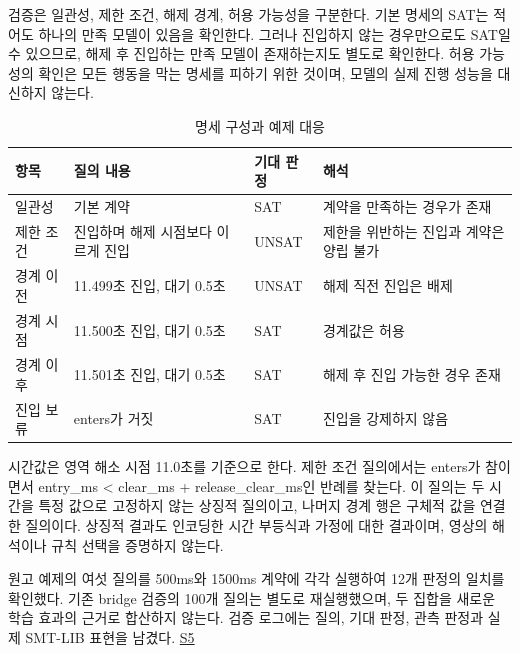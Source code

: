 \documentclass[10pt,a4paper,twocolumn]{article}\usepackage[margin=18mm]{geometry}\usepackage{fontspec,kotex}
\begin{document}
검증은 일관성, 제한 조건, 해제 경계, 허용 가능성을 구분한다. 기본 명세의 SAT는 적어도 하나의 만족 모델이 있음을 확인한다. 그러나 진입하지 않는 경우만으로도 SAT일 수 있으므로, 해제 후 진입하는 만족 모델이 존재하는지도 별도로 확인한다. 허용 가능성의 확인은 모든 행동을 막는 명세를 피하기 위한 것이며, 모델의 실제 진행 성능을 대신하지 않는다.\par

\begin{table}[tp]\caption{명세 구성과 예제 대응}
\centering\fontsize{8}{10}\selectfont\setlength{\tabcolsep}{3pt}
\begin{tabular}{@{}>{\raggedright\arraybackslash}p{}>{\raggedright\arraybackslash}p{}>{\raggedright\arraybackslash}p{}>{\raggedright\arraybackslash}p{}@{}}
\toprule
\textbf{항목} & \textbf{질의 내용} & \textbf{기대 판정} & \textbf{해석}\\
\midrule
일관성 & 기본 계약 & SAT & 계약을 만족하는 경우가 존재\\[3pt]
제한 조건 & 진입하며 해제 시점보다 이르게 진입 & UNSAT & 제한을 위반하는 진입과 계약은 양립 불가\\[3pt]
경계 이전 & 11.499초 진입, 대기 0.5초 & UNSAT & 해제 직전 진입은 배제\\[3pt]
경계 시점 & 11.500초 진입, 대기 0.5초 & SAT & 경계값은 허용\\[3pt]
경계 이후 & 11.501초 진입, 대기 0.5초 & SAT & 해제 후 진입 가능한 경우 존재\\[3pt]
진입 보류 & enters가 거짓 & SAT & 진입을 강제하지 않음\\[3pt]
\bottomrule\end{tabular}
\end{table}

시간값은 영역 해소 시점 11.0초를 기준으로 한다. 제한 조건 질의에서는 {\ttfamily{}\selectfont\footnotesize enters}가 참이면서 {\ttfamily{}\selectfont\footnotesize entry\_\allowbreak ms < clear\_\allowbreak ms + release\_\allowbreak clear\_\allowbreak ms}인 반례를 찾는다. 이 질의는 두 시간을 특정 값으로 고정하지 않는 상징적 질의이고, 나머지 경계 행은 구체적 값을 연결한 질의이다. 상징적 결과도 인코딩한 시간 부등식과 가정에 대한 결과이며, 영상의 해석이나 규칙 선택을 증명하지 않는다.\par

원고 예제의 여섯 질의를 500ms와 1500ms 계약에 각각 실행하여 12개 판정의 일치를 확인했다. 기존 bridge 검증의 100개 질의는 별도로 재실행했으며, 두 집합을 새로운 학습 효과의 근거로 합산하지 않는다. 검증 로그에는 질의, 기대 판정, 관측 판정과 실제 SMT-LIB 표현을 남겼다. \href{\detokenize{/home/jinhyun/prj_ws/prj_jin/guardsynth-cc/artifacts/projects/guardsynth-coc/public/paper1-method-preservation-001/methodology-2026-09-30-001/manuscript_examples.json}}{S5}\par
\end{document}
